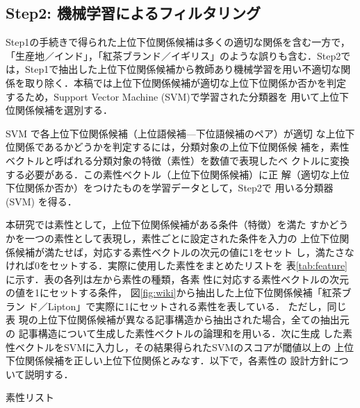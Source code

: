 \documentclass[japanese]{jnlp_1.4}
\begin{document}
\subsection{Step2: 機械学習によるフィルタリング}

Step1の手続きで得られた上位下位関係候補は多くの適切な関係を含む一方で，
「生産地／インド」，「紅茶ブランド／イギリス」のような誤りも含む．Step2で
は，Step1で抽出した上位下位関係候補から教師あり機械学習を用い不適切な関
係を取り除く．本稿では上位下位関係候補が適切な上位下位関係か否かを判定
するため，Support Vector Machine (SVM)\cite{Vapnik}で学習された分類器を
用いて上位下位関係候補を選別する．

{SVM で各上位下位関係候補（上位語候補—下位語候補のペア）が適切
  な上位下位関係であるかどうかを判定するには，分類対象の上位下位関係候
  補を，素性ベクトルと呼ばれる分類対象の特徴（素性）を数値で表現したベ
  クトルに変換する必要がある．この素性ベクトル（上位下位関係候補）に正
  解（適切な上位下位関係か否か）をつけたものを学習データとして，Step2で
  用いる分類器 (SVM) を得る．
}

{本研究では素性として，上位下位関係候補がある条件（特徴）を満た
  すかどうかを一つの素性として表現し，素性ごとに設定された条件を入力の
  上位下位関係候補が満たせば，対応する素性ベクトルの次元の値に1をセット
  し，満たさなければ0をセットする．実際に使用した素性をまとめたリストを
  表}\ref{tab:feature}{に示す．表の各列は左から素性の種類，各素
  性に対応する素性ベクトルの次元の値を1にセットする条件，
  図}\ref{fig:wiki}{から抽出した上位下位関係候補「紅茶ブラン
  ド／Lipton」で実際に1にセットされる素性を表している．} ただし，同じ表
現の上位下位関係候補が異なる記事構造から抽出された場合，全ての抽出元の
記事構造について生成した素性ベクトル{の論理和を用いる．}次に生成
した素性ベクトルをSVMに入力し，その結果得られたSVMのスコアが閾値以上の
上位下位関係候補を正しい上位下位関係とみなす．以下で，各素性{の
  設計方針}について説明する．

\begin{table}[t]
\caption{素性リスト}
\label{tab:feature}

\end{table}
\end{document}
